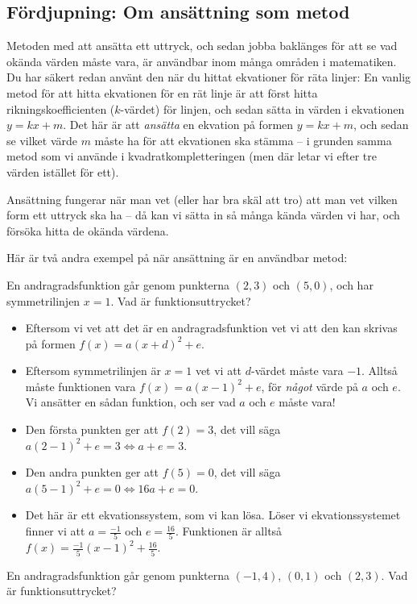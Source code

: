 \subsection{Fördjupning: Om ansättning som metod}

Metoden med att ansätta ett uttryck, och sedan jobba baklänges för att se vad okända värden måste vara, är användbar inom många områden i matematiken.
Du har säkert redan använt den när du hittat ekvationer för räta linjer:
En vanlig metod för att hitta ekvationen för en rät linje är att först hitta rikningskoefficienten ($k$-värdet) för linjen, och sedan sätta in värden i ekvationen $y=kx+m$.
Det här är att \emph{ansätta} en ekvation på formen $y=kx+m$, och sedan se vilket värde $m$ måste ha för att ekvationen ska stämma -- i grunden samma metod som vi använde i kvadratkompletteringen (men där letar vi efter tre värden istället för ett).

Ansättning fungerar när man vet (eller har bra skäl att tro) att man vet vilken form ett uttryck ska ha -- då kan vi sätta in så många kända värden vi har, och försöka hitta de okända värdena.

Här är två andra exempel på när ansättning är en användbar metod:

En andragradsfunktion går genom punkterna $(2, 3)$ och $(5, 0)$, och har symmetrilinjen $x=1$. Vad är funktionsuttrycket?

\begin{itemize}
  \item Eftersom vi vet att det är en andragradsfunktion vet vi att den kan skrivas på formen $f(x)=a(x+d)^2+e$.
  \item Eftersom symmetrilinjen är $x=1$ vet vi att $d$-värdet måste vara $-1$.
  Alltså måste funktionen vara $f(x)=a(x-1)^2+e$, för \emph{något} värde på $a$ och $e$.
  Vi ansätter en sådan funktion, och ser vad $a$ och $e$ måste vara!
  \item Den första punkten ger att $f(2)=3$, det vill säga $a(2-1)^2+e=3 \Leftrightarrow a+e=3$.
  \item Den andra punkten ger att $f(5)=0$, det vill säga $a(5-1)^2+e=0 \Leftrightarrow 16a+e=0$.
  \item Det här är ett ekvationssystem, som vi kan lösa.
  Löser vi ekvationssystemet finner vi att $a=\frac{-1}{5}$ och $e=\frac{16}{5}$.
  Funktionen är alltså $f(x)=\frac{-1}{5}(x-1)^2 + \frac{16}{5}$.
\end{itemize}

En andragradsfunktion går genom punkterna $(-1, 4)$, $(0, 1)$ och $(2, 3)$. Vad är funktionsuttrycket?


